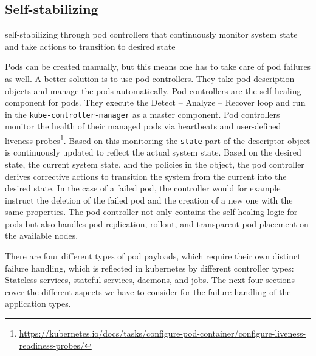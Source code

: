 \subsection{Self-stabilizing}\label{sec:self-healing-kubernetes:self-stabilizing}
  self-stabilizing through pod controllers that continuously monitor system state and take actions to transition to desired state

  Pods can be created manually, but this means one has to take care of pod failures as well.
  A better solution is to use pod controllers.
  They take pod description objects and manage the pods automatically.
  Pod controllers are the self-healing component for pods.
  They execute the Detect -- Analyze -- Recover loop and run in the \texttt{kube-controller-manager} as a master component.
  Pod controllers monitor the health of their managed pods via heartbeats and user-defined liveness probes\footnote{\url{https://kubernetes.io/docs/tasks/configure-pod-container/configure-liveness-readiness-probes/}}.
  Based on this monitoring the \texttt{state} part of the descriptor object is continuously updated to reflect the actual system state.
  Based on the desired state, the current system state, and the policies in the object, the pod controller derives corrective actions to transition the system from the current into the desired state.
  In the case of a failed pod, the controller would for example instruct the deletion of the failed pod and the creation of a new one with the same properties.
  The pod controller not only contains the self-healing logic for pods but also handles pod replication, rollout, and transparent pod placement on the available nodes.

  There are four different types of pod payloads, which require their own distinct failure handling, which is reflected in \gls{kubernetes} by different controller types:
  Stateless services, stateful services, daemons, and jobs.
  The next four sections cover the different aspects we have to consider for the failure handling of the application types.

